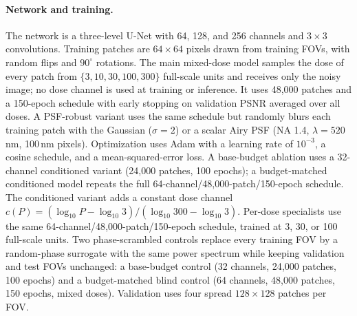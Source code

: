 \documentclass[10pt]{article}
\begin{document}
\paragraph{Network and training.}
The network is a three-level U-Net \cite{ronneberger2015unet} with 64, 128, and
256 channels and $3\times3$ convolutions. Training patches are $64\times64$
pixels drawn from training FOVs, with random flips and $90^\circ$ rotations.
The main mixed-dose model samples the dose of every patch from
$\{3,10,30,100,300\}$ full-scale units and receives only the noisy image; no
dose channel is used at training or inference. It uses 48{,}000 patches and a
150-epoch schedule with early stopping on validation PSNR averaged over all
doses. A PSF-robust variant uses the same schedule but randomly blurs each
training patch with the Gaussian ($\sigma=2$) or a scalar Airy PSF (NA 1.4,
$\lambda=520$\,nm, 100\,nm pixels). Optimization
uses Adam with a learning rate of $10^{-3}$, a cosine schedule, and a
mean-squared-error loss. A base-budget ablation uses a 32-channel
conditioned variant (24{,}000 patches, 100 epochs); a budget-matched
conditioned model repeats the full 64-channel/48{,}000-patch/150-epoch
schedule. The conditioned variant adds a constant dose channel
$c(P)=(\log_{10}P-\log_{10}3)/(\log_{10}300-\log_{10}3)$. Per-dose specialists
use the same 64-channel/48{,}000-patch/150-epoch schedule, trained at 3, 30, or
100 full-scale units. Two phase-scrambled controls replace every training FOV by a
random-phase surrogate with the same power spectrum while keeping validation
and test FOVs unchanged: a base-budget control (32 channels, 24{,}000 patches,
100 epochs) and a budget-matched blind control (64 channels, 48{,}000 patches,
150 epochs, mixed doses). Validation uses four spread $128\times128$ patches
per FOV.
\end{document}
